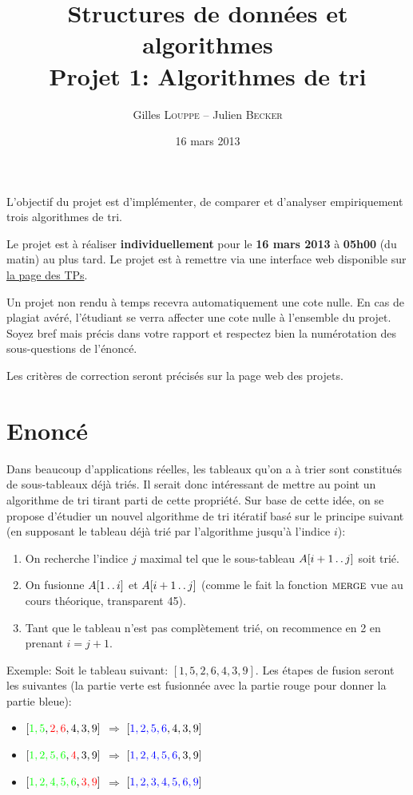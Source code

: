 \documentclass[a4paper,10pt]{article}
\title{
    \textbf{Structures de données et algorithmes}\\
    Projet 1: Algorithmes de tri
}
\author{Gilles \textsc{Louppe} -- Julien \textsc{Becker}}
\date{16 mars 2013}
\begin{document}
\maketitle

L'objectif du projet est d'implémenter, de comparer et d'analyser empiriquement
trois algorithmes de tri.

Le projet est à réaliser {\bf individuellement} pour le {\bf 16 mars 2013} à
{\bf 05h00} (du matin) au plus tard. Le projet est à remettre via une interface
web disponible sur \href{http://www.montefiore.ulg.ac.be/~glouppe/2012-2013/students.info0902.php}{la page des TPs}.

Un projet non rendu à temps recevra automatiquement une cote nulle. En
cas de plagiat avéré, l'étudiant se verra affecter une cote nulle à
l'ensemble du projet. Soyez bref mais précis dans votre rapport et
respectez bien la numérotation des sous-questions de l'énoncé.

Les critères de correction seront précisés sur la page web des
projets.

\section{Enoncé}

Dans beaucoup d'applications réelles, les tableaux qu'on a à trier
sont constitués de sous-tableaux déjà triés. Il serait donc
intéressant de mettre au point un algorithme de tri tirant parti de
cette propriété. Sur base de cette idée, on se propose d'étudier un
nouvel algorithme de tri itératif basé sur le principe suivant (en
supposant le tableau déjà trié par l'algorithme jusqu'à l'indice $i$):
\begin{enumerate}
\item On recherche l'indice $j$ maximal tel que le sous-tableau $A[i+1\mathinner{\ldotp\ldotp} j]$ soit trié.
\item On fusionne $A[1\mathinner{\ldotp\ldotp} i]$ et $A[i+1 \mathinner{\ldotp\ldotp} j]$ (comme le
  fait la fonction $\textnormal{\scshape merge}$ vue au cours théorique, transparent
  45).
\item Tant que le tableau n'est pas complètement trié, on recommence
  en 2 en prenant $i=j+1$.
\end{enumerate}

\bigskip

Exemple: Soit le tableau suivant: $[1,5,2,6,4,3,9]$. Les étapes de
fusion seront les suivantes (la partie verte est fusionnée avec la
partie rouge pour donner la partie bleue):
\begin{itemize}
\item $[{\color{green} 1,5},{\color{red} 2,6},4,3,9]$ $\Rightarrow$ $[{\color{blue} 1,2,5,6},4,3,9]$
\item $[{\color{green} 1,2,5,6},{\color{red}4},3,9]$ $\Rightarrow$ $[{\color{blue} 1,2,4,5,6},3,9]$
\item $[{\color{green} 1,2,4,5,6},{\color{red} 3,9}]$ $\Rightarrow$ $[{\color{blue} 1,2,3,4,5,6,9}]$
\end{itemize}
\end{document}
